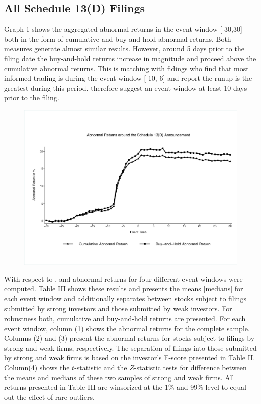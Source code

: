 \documentclass[12pt]{article}
\begin{document}
\subsection{All Schedule 13(D) Filings}
Graph 1 shows the aggregated abnormal returns in the event window [-30,30] both in the form of cumulative and buy-and-hold abnormal returns. Both measures generate almost similar results. However, around 5 days prior to the filing date the buy-and-hold returns increase in magnitude and proceed above the cumulative abnormal returns. This is matching with \citet{Brigida2012} fidings who find that most informed trading is during the event-window [-10,-6] and report the runup is the greatest during this period. \citet{Brigida2012} therefore suggest an event-window at least 10 days prior to the filing.  
\begin{figure}
	\includegraphics{Abnormal_Returns.eps} \label{AR both}
\end{figure}
With respect to \citet{Brigida2012}, \citet{Klein2009} and \citet{Brav2008} abnormal returns for four different event windows were computed. Table III shows these results and presents the means [medians] for each event window and additionally separates between stocks subject to filings submitted by strong investors and those submitted by weak investors. For robustness both, cumulative and buy-and-hold returns are presented. For each event window, column (1) shows the abnormal returns for the complete sample. Columns (2) and (3) present the abnormal returns for stocks subject to filings by strong and weak firms, respectively. The separation of filings into those submitted by strong and weak firms is based on the investor's F-score presented in Table II. Column(4) shows the $t$-statistic and the $Z$-statistic tests for difference between the means and medians of these two samples of strong and weak firms. All returns presented in Table III are winsorized at the 1\% and 99\% level to equal out the effect of rare outliers. 
\end{document}
